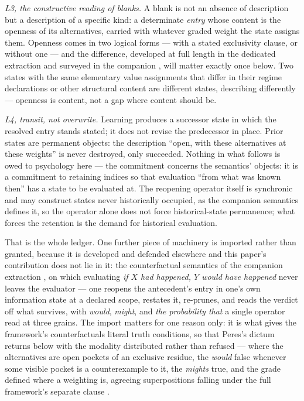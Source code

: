 \emph{L3, the constructive reading of blanks.} A blank is not an absence of description but a description of a specific kind: a determinate \emph{entry} whose content is the openness of its alternatives, carried with whatever graded weight the state assigns them. Openness comes in two logical forms --- with a stated exclusivity clause, or without one --- and the difference, developed at full length in the dedicated extraction \cite{AethusUnion} and surveyed in the companion \cite{AethusBrief}, will matter exactly once below. Two states with the same elementary value assignments that differ in their regime declarations or other structural content are different states, describing differently --- openness is content, not a gap where content should be.

\emph{L4, transit, not overwrite.} Learning produces a successor state in which the resolved entry stands stated; it does not revise the predecessor in place. Prior states are permanent objects: the description ``open, with these alternatives at these weights'' is never destroyed, only succeeded. Nothing in what follows is owed to psychology here --- the commitment concerns the semantics' objects: it is a commitment to retaining indices so that evaluation ``from what was known then'' has a state to be evaluated at. The reopening operator itself is synchronic and may construct states never historically occupied, as the companion semantics defines it, so the operator alone does not force historical-state permanence; what forces the retention is the demand for historical evaluation.

That is the whole ledger. One further piece of machinery is imported rather than granted, because it is developed and defended elsewhere and this paper's contribution does not lie in it: the counterfactual semantics of the companion extraction \cite{AethusSemantics}, on which evaluating \emph{if $X$ had happened, $Y$ would have happened} never leaves the evaluator --- one reopens the antecedent's entry in one's own information state at a declared scope, restates it, re-prunes, and reads the verdict off what survives, with \emph{would}, \emph{might}, and \emph{the probability that} a single operator read at three grains. The import matters for one reason only: it is what gives the framework's counterfactuals literal truth conditions, so that Peres's dictum returns below with the modality distributed rather than refused --- where the alternatives are open pockets of an exclusive residue, the \emph{would} false whenever some visible pocket is a counterexample to it, the \emph{mights} true, and the grade defined where a weighting is, agreeing superpositions falling under the full framework's separate clause \cite{peres1978unperformed}.

